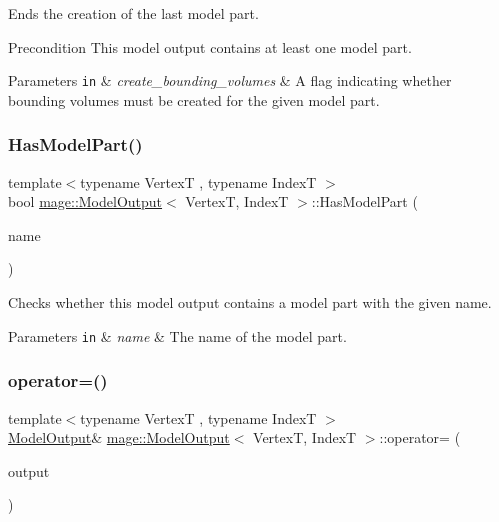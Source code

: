 Ends the creation of the last model part.

\begin{DoxyPrecond}{Precondition}
This model output contains at least one model part. 
\end{DoxyPrecond}

\begin{DoxyParams}[1]{Parameters}
\mbox{\tt in}  & {\em create\+\_\+bounding\+\_\+volumes} & A flag indicating whether bounding volumes must be created for the given model part. \\
\hline
\end{DoxyParams}
\hypertarget{structmage_1_1_model_output_aec5c98c2c4f64d2cd345a2c868498cfc}{}\label{structmage_1_1_model_output_aec5c98c2c4f64d2cd345a2c868498cfc} 
\subsubsection{\texorpdfstring{Has\+Model\+Part()}{HasModelPart()}}
{\footnotesize\ttfamily template$<$typename VertexT , typename IndexT $>$ \\
bool \hyperlink{structmage_1_1_model_output}{mage\+::\+Model\+Output}$<$ VertexT, IndexT $>$\+::Has\+Model\+Part (\begin{DoxyParamCaption}\item[{const string \&}]{name }\end{DoxyParamCaption})\hspace{0.3cm}{\ttfamily [noexcept]}}

Checks whether this model output contains a model part with the given name.


\begin{DoxyParams}[1]{Parameters}
\mbox{\tt in}  & {\em name} & The name of the model part. \\
\hline
\end{DoxyParams}
\hypertarget{structmage_1_1_model_output_a5d206619319fed85a4add63ee0532cac}{}\label{structmage_1_1_model_output_a5d206619319fed85a4add63ee0532cac} 
\subsubsection{\texorpdfstring{operator=()}{operator=()}\hspace{0.1cm}{\footnotesize\ttfamily [1/2]}}
{\footnotesize\ttfamily template$<$typename VertexT , typename IndexT $>$ \\
\hyperlink{structmage_1_1_model_output}{Model\+Output}\& \hyperlink{structmage_1_1_model_output}{mage\+::\+Model\+Output}$<$ VertexT, IndexT $>$\+::operator= (\begin{DoxyParamCaption}\item[{const \hyperlink{structmage_1_1_model_output}{Model\+Output}$<$ VertexT, IndexT $>$ \&}]{output }\end{DoxyParamCaption})\hspace{0.3cm}{\ttfamily [delete]}}

